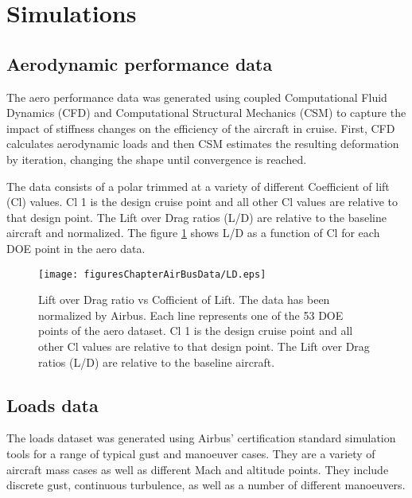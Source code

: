 \section{Simulations} \label{sec_simulations}

\subsection{Aerodynamic performance data} \label{sec_aero}

The aero performance data was generated using coupled Computational Fluid Dynamics (CFD) and Computational Structural Mechanics (CSM) to capture the impact of stiffness changes on the efficiency of the aircraft in cruise. First, CFD calculates aerodynamic loads and then CSM estimates the resulting deformation by iteration, changing the shape until convergence is reached.

The data consists of a polar trimmed at a variety of different Coefficient of lift (Cl) values. Cl 1 is the design cruise point and all other Cl values are relative to that design point. The Lift over Drag ratios (L/D) are relative to the baseline aircraft and normalized. The figure \ref{fig_LD} shows L/D as a function of Cl for each DOE point in the aero data.

\begin{figure}[!htbp]
  \centering
    \texttt{[image: figuresChapterAirBusData/LD.eps]}
  \caption[Lift over Drag ratio vs Cofficient of Lift]%
{Lift over Drag ratio vs Cofficient of Lift. The data has been normalized by Airbus. Each line represents one of the 53 DOE points of the aero dataset. Cl 1 is the design cruise point and all other Cl values are relative to that design point. The Lift over Drag ratios (L/D) are relative to the baseline aircraft.}
  \label{fig_LD}
\end{figure}

\subsection{Loads data} \label{sec_loads}

The loads dataset was generated using Airbus’ certification standard simulation tools for a range of typical gust and manoeuver cases. They are a variety of aircraft mass cases as well as different Mach and altitude points. They include discrete gust, continuous turbulence, as well as a number of different manoeuvers.

